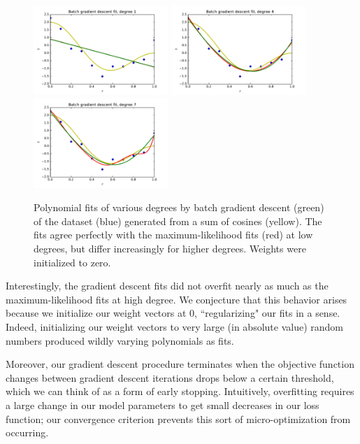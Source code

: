 \documentclass{article}
\begin{document}
\begin{multicols}{2}
\begin{figure}[h]
   \centering
   \includegraphics[width=2in]{img/2-3_bgd_fit_degree1.pdf}
   \includegraphics[width=2in]{img/2-3_bgd_fit_degree4.pdf}
   \includegraphics[width=2in]{img/2-3_bgd_fit_degree7.pdf}
   \caption{Polynomial fits of various degrees by batch gradient descent (green) of the dataset (blue) generated from a sum of cosines (yellow).
   The fits agree perfectly with the maximum-likelihood fits (red) at low degrees, but differ increasingly for higher degrees.
   Weights were initialized to zero.
   }
   \label{fig:bgd-poly-fits}
\end{figure}

Interestingly, the gradient descent fits did not overfit nearly as much as the maximum-likelihood fits at high degree.
We conjecture that this behavior arises because we initialize our weight vectors at 0, ``regularizing" our fits in a sense.
Indeed, initializing our weight vectors to very large (in absolute value) random numbers produced wildly varying polynomials as fits.

Moreover, our gradient descent procedure terminates when the objective function changes between gradient descent iterations drops below a certain threshold, which we can think of as a form of early stopping.
Intuitively, overfitting requires a large change in our model parameters to get small decreases in our loss function; our convergence criterion prevents this sort of micro-optimization from occurring.


\end{multicols}
\end{document}
